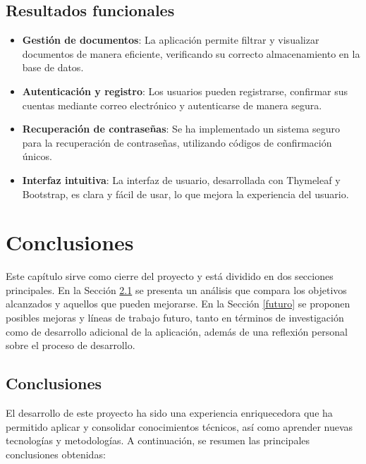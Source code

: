 \documentclass[draft]{scrbook}
\begin{document}
\section{Resultados funcionales}
\begin{itemize}
    \item \textbf{Gestión de documentos}: La aplicación permite filtrar y visualizar documentos de manera eficiente, verificando su correcto almacenamiento en la base de datos.
    \item \textbf{Autenticación y registro}: Los usuarios pueden registrarse, confirmar sus cuentas mediante correo electrónico y autenticarse de manera segura.
    \item \textbf{Recuperación de contraseñas}: Se ha implementado un sistema seguro para la recuperación de contraseñas, utilizando códigos de confirmación únicos.
    \item \textbf{Interfaz intuitiva}: La interfaz de usuario, desarrollada con Thymeleaf y Bootstrap, es clara y fácil de usar, lo que mejora la experiencia del usuario.
\end{itemize}


\chapter{Conclusiones}

Este capítulo sirve como cierre del proyecto y está dividido en dos secciones principales. En la Sección \ref{sec:conclusiones} se presenta un análisis que compara los objetivos alcanzados y aquellos que pueden mejorarse. En la Sección \ref{futuro} se proponen posibles mejoras y líneas de trabajo futuro, tanto en términos de investigación como de desarrollo adicional de la aplicación, además de una reflexión personal sobre el proceso de desarrollo.

\section{Conclusiones}
\label{sec:conclusiones}

El desarrollo de este proyecto ha sido una experiencia enriquecedora que ha permitido aplicar y consolidar conocimientos técnicos, así como aprender nuevas tecnologías y metodologías. A continuación, se resumen las principales conclusiones obtenidas:
\end{document}
